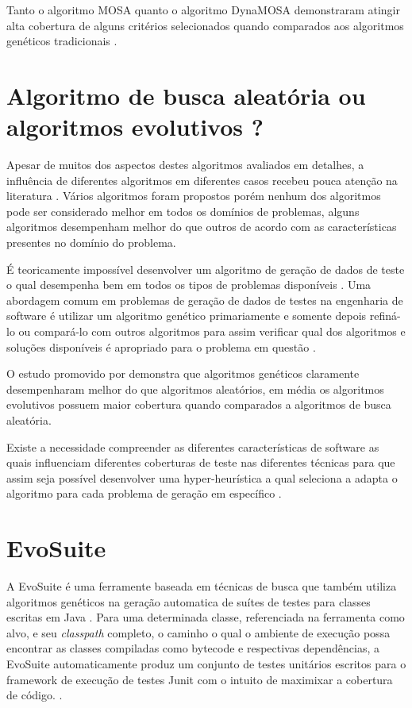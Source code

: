 \documentclass[
	12pt,				%
	oneside,			%
	a4paper,			%
	english,			%
	brazil				%
	]{abntex2ppgsi}
\begin{document}
Tanto o algoritmo MOSA quanto o algoritmo DynaMOSA demonstraram atingir alta cobertura de alguns critérios selecionados quando comparados aos algoritmos genéticos tradicionais \cite{Campos2017}.

\section{Algoritmo de busca aleatória ou algoritmos evolutivos ?}
Apesar de muitos dos aspectos destes algoritmos avaliados em detalhes, a influência de diferentes algoritmos em diferentes casos recebeu pouca atenção na literatura \cite{Campos2017}. Vários algoritmos foram propostos porém nenhum dos algoritmos pode ser considerado melhor em todos os domínios de problemas, alguns algoritmos desempenham melhor do que outros de acordo com as características presentes no domínio do problema. \cite{Campos2017}


É teoricamente impossível desenvolver um algoritmo de geração de dados de teste o qual desempenha bem em todos os tipos de problemas disponíveis \cite{Campos2017}. Uma abordagem comum em problemas de geração de dados de testes na engenharia de software é utilizar um algoritmo genético primariamente e somente depois refiná-lo ou compará-lo com outros algoritmos para assim verificar qual dos algoritmos e soluções disponíveis  é apropriado para o problema em questão \cite{Campos2017}.

O estudo promovido por \cite{Campos2017} demonstra que algoritmos genéticos claramente desempenharam melhor do que algoritmos aleatórios, em média os algoritmos evolutivos possuem maior cobertura quando comparados a algoritmos de busca aleatória. \cite{Campos2017}

Existe a necessidade compreender as diferentes características de software as quais influenciam diferentes coberturas de teste nas diferentes técnicas para que assim seja possível desenvolver uma hyper-heurística a qual seleciona a adapta o algoritmo para cada problema de geração em específico \cite{Campos2017}.

\section{EvoSuite}

A EvoSuite  é uma ferramente baseada em técnicas de busca que também utiliza algoritmos genéticos na geração automatica de suítes de testes para classes escritas em Java \cite{Fraser2017}. Para uma determinada classe, referenciada na ferramenta como alvo, e seu \textit{classpath} completo, o caminho o qual o ambiente de execução possa encontrar as classes compiladas como bytecode e respectivas dependências, a EvoSuite automaticamente produz um conjunto de testes unitários escritos para o framework de execução de testes Junit com o intuito de maximixar a cobertura de código. \cite{Fraser2017}.
\end{document}
